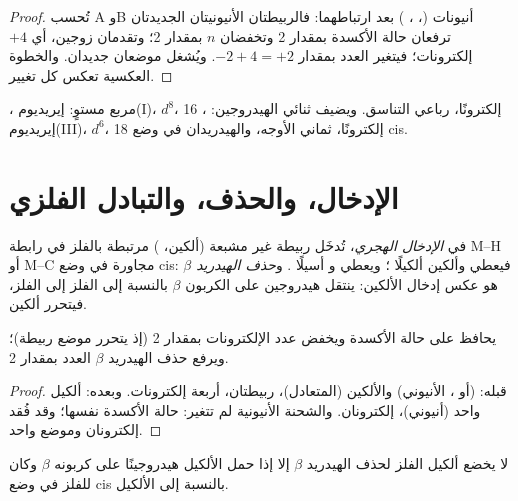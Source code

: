 \begin{proof}
تُحسب A وB أنيونات (، ، ) بعد ارتباطهما: فالربيطتان الأنيونيتان
الجديدتان ترفعان حالة الأكسدة بمقدار 2 وتخفضان $n$ بمقدار 2؛ وتقدمان زوجين، أي $+4$
إلكترونات؛ فيتغير العدد بمقدار $-2 + 4 = +2$. ويُشغل موضعان جديدان. 
والخطوة العكسية تعكس كل تغيير.
\end{proof}

\begin{example}\label{ex:b2:catalytic-cycles:vaska}
، مربع مستوٍ: إيريديوم(I)، $d^8$، 16 إلكترونًا، رباعي التناسق.
ويضيف ثنائي الهيدروجين: ، إيريديوم(III)، $d^6$، 18 إلكترونًا، ثماني الأوجه،
والهيدريدان في وضع cis.
\end{example}

\section{الإدخال، والحذف، والتبادل الفلزي}

\begin{definition}\label{def:b2:catalytic-cycles:insertion}
في \emph{الإدخال الهجري}، تُدخَل ربيطة غير مشبعة
(ألكين، ) مرتبطة بالفلز في رابطة M--H أو M--C مجاورة في وضع cis: فيعطي  
وألكين ألكيلًا ؛ ويعطي  و أسيلًا .
و\emph{حذف الهيدريد $\beta$}
هو عكس إدخال الألكين: ينتقل هيدروجين على الكربون $\beta$ بالنسبة إلى
الفلز إلى الفلز، فيتحرر ألكين.
\end{definition}

\begin{proposition}[عدّ الإدخال]\label{prop:b2:catalytic-cycles:insertion}
يحافظ  على حالة الأكسدة ويخفض عدد الإلكترونات بمقدار 2
(إذ يتحرر موضع ربيطة)؛ ويرفع حذف الهيدريد $\beta$ العدد بمقدار 2.
\end{proposition}

\begin{proof}
قبله:  (أو ، الأنيوني) والألكين (المتعادل)، ربيطتان، أربعة إلكترونات.
وبعده: ألكيل واحد (أنيوني)، إلكترونان. والشحنة الأنيونية لم تتغير: حالة
الأكسدة نفسها؛ وقد فُقد إلكترونان وموضع واحد.
\end{proof}

\begin{proposition}\label{prop:b2:catalytic-cycles:beta-h}
لا يخضع ألكيل الفلز لحذف الهيدريد $\beta$ إلا إذا حمل الألكيل هيدروجينًا على
كربونه $\beta$ وكان للفلز  في وضع cis بالنسبة إلى الألكيل.
\end{proposition}

